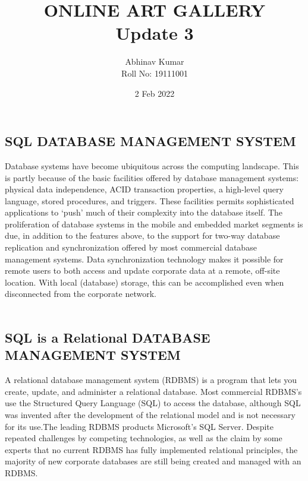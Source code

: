\documentclass{article}
\title{ONLINE ART GALLERY \\ Update 3}
\date{2 Feb 2022}
\author{Abhinav Kumar \\ Roll No: 19111001 }
\begin{document}
\maketitle
\begin{center}
   \section*{\textbf{SQL DATABASE MANAGEMENT SYSTEM}} 
\end{center}
Database systems have become ubiquitous across the computing landscape. This is partly because of the basic facilities offered by database management systems: physical data independence, ACID transaction properties, a high-level query language, stored procedures, and triggers. These facilities permits sophisticated applications to ‘push’ much of their complexity into the database itself. The proliferation of database systems in the mobile and embedded market segments is due, in addition to the features above, to the support for two-way database replication and synchronization offered by most commercial database management systems. Data synchronization technology makes it possible for remote users to both access and update corporate data at a remote, off-site location. With local (database) storage, this can be accomplished even when disconnected from the corporate network.
\\
\\
\begin{center}
   \section*{\textbf{SQL is a Relational DATABASE MANAGEMENT SYSTEM}} 
\end{center}
A relational database management system (RDBMS) is a program that lets you create, update, and administer a relational database. Most commercial RDBMS's use the Structured Query Language (SQL) to access the database, although SQL was invented after the development of the relational model and is not necessary for its use.The leading RDBMS products Microsoft's SQL Server. Despite repeated challenges by competing technologies, as well as the claim by some experts that no current RDBMS has fully implemented relational principles, the majority of new corporate databases are still being created and managed with an RDBMS.
\end{document}
